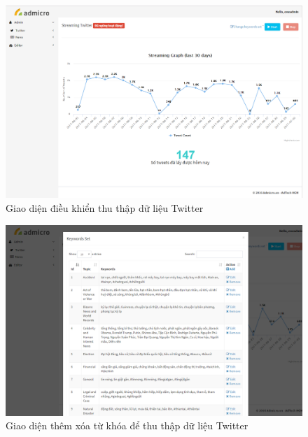 \begin{figure}[H]
	\centering
	\includegraphics[width=1\linewidth]{Chapter3/Chapter3Figs/StreamingNonwide}
	\caption{Giao diện điều khiển thu thập dữ liệu Twitter}
	\label{fig:streaming}
\end{figure}

\begin{figure}[H]
	\centering
	\includegraphics[width=0.96\linewidth]{Chapter3/Chapter3Figs/StreamingKeywords}
	\caption{Giao diện thêm xóa từ khóa để thu thập dữ liệu Twitter}
	\label{fig:streamingkeywords}
\end{figure}

